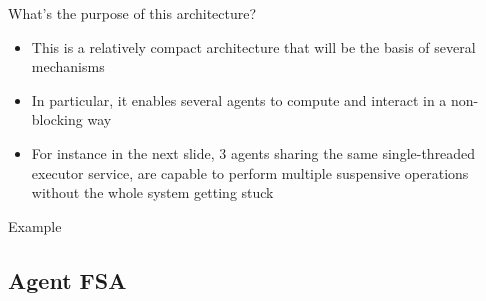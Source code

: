 \documentclass[presentation]{beamer}\mode<presentation>{\usetheme{AMSCesenaPurpleAndGold}}
\begin{document}
\begin{frame}{What's the purpose of this architecture?}

\begin{itemize}
    \item This is a relatively compact architecture that will be the basis of several mechanisms
    
    \vfill
    
    \item In particular, it enables several agents to compute and interact in a \alert{non-blocking} way
    
    \vfill
    
    \item For instance in the next slide, 3 agents sharing the same \alert{single-threaded} executor service, are capable to perform multiple \alert{suspensive} operations without the whole system getting stuck
\end{itemize}

\end{frame}

\begin{frame}[allowframebreaks]{Example}
    
    
    
    
    
    
    
        
        
\end{frame}

\subsection{Agent FSA}
\end{document}
